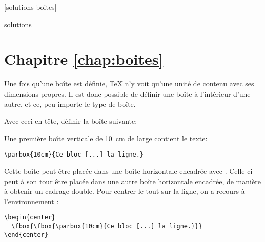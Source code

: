 [solutions-boites]

\begin{Filesave}{solutions}
\section*{Chapitre \ref*{chap:boites}}

\end{Filesave}


\begin{exercice}
  Une fois qu'une boîte est définie, {\TeX} n'y voit qu'une unité de
  contenu avec ses dimensions propres. Il est donc possible de définir
  une boîte à l'intérieur d'une autre, et ce, peu importe le type de
  boîte.

  Avec ceci en tête, définir la boîte suivante:
  \begin{center}
  \end{center}

  \begin{sol}
    Une première boîte verticale de 10~cm de large contient le texte:
\begin{lstlisting}
\parbox{10cm}{Ce bloc [...] la ligne.}
\end{lstlisting}
    Cette boîte peut être placée dans une boîte horizontale encadrée
    avec \cmd{\fbox}. Celle-ci peut à son tour être placée dans une autre
    boîte horizontale encadrée, de manière à obtenir un cadrage
    double. Pour centrer le tout sur la ligne, on a recours à
    l'environnement :
\begin{lstlisting}
\begin{center}
  \fbox{\fbox{\parbox{10cm}{Ce bloc [...] la ligne.}}}
\end{center}
\end{lstlisting}
  \end{sol}
\end{exercice}


